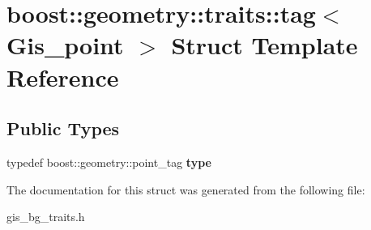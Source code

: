\hypertarget{structboost_1_1geometry_1_1traits_1_1tag_3_01Gis__point_01_4}{}\section{boost\+:\+:geometry\+:\+:traits\+:\+:tag$<$ Gis\+\_\+point $>$ Struct Template Reference}
\label{structboost_1_1geometry_1_1traits_1_1tag_3_01Gis__point_01_4}
\subsection*{Public Types}
\begin{DoxyCompactItemize}
\item 
\mbox{\label{structboost_1_1geometry_1_1traits_1_1tag_3_01Gis__point_01_4_a2f114c7d4d5d7035939bad03c7812cbb}} 
typedef boost\+::geometry\+::point\+\_\+tag {\bfseries type}
\end{DoxyCompactItemize}


The documentation for this struct was generated from the following file\+:\begin{DoxyCompactItemize}
\item 
gis\+\_\+bg\+\_\+traits.\+h\end{DoxyCompactItemize}

